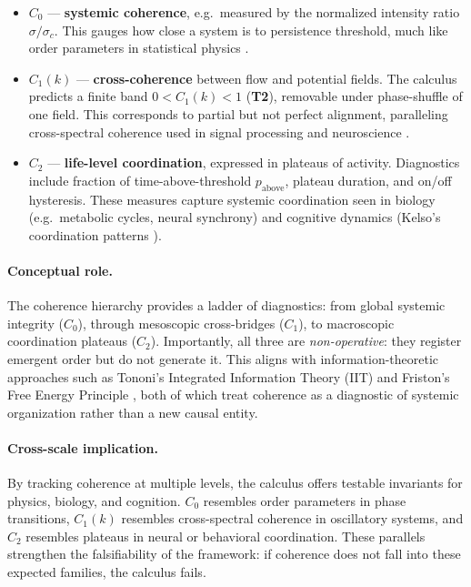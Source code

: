 \documentclass[12pt,a4paper,oneside]{scrreprt}
\begin{document}
\begin{itemize}
  \item $C_0$ — \textbf{systemic coherence}, e.g.\ measured by the normalized intensity ratio $\sigma/\sigma_c$. 
  This gauges how close a system is to persistence threshold, much like order parameters in statistical physics \citep{Stanley1971Phase}.
  
  \item $C_1(k)$ — \textbf{cross-coherence} between flow and potential fields. 
  The calculus predicts a finite band $0 < C_1(k) < 1$ (\textbf{T2}), 
  removable under phase-shuffle of one field. 
  This corresponds to partial but not perfect alignment, paralleling cross-spectral coherence used in signal processing and neuroscience \citep{Bendat2010Random}. 
  
  \item $C_2$ — \textbf{life-level coordination}, expressed in plateaus of activity. 
  Diagnostics include fraction of time-above-threshold $p_{\mathrm{above}}$, 
  plateau duration, and on/off hysteresis. 
  These measures capture systemic coordination seen in biology (e.g.\ metabolic cycles, neural synchrony) and cognitive dynamics (Kelso’s coordination patterns \citep{Kelso1995Coordination}).
\end{itemize}

\paragraph{Conceptual role.} 
The coherence hierarchy provides a ladder of diagnostics: 
from global systemic integrity ($C_0$), through mesoscopic cross-bridges ($C_1$), 
to macroscopic coordination plateaus ($C_2$). 
Importantly, all three are \emph{non-operative}: they register emergent order but 
do not generate it. 
This aligns with information-theoretic approaches such as Tononi’s 
Integrated Information Theory (IIT) \citep{Tononi2004IIT} and Friston’s 
Free Energy Principle \citep{Friston2010FEP}, both of which treat coherence 
as a diagnostic of systemic organization rather than a new causal entity.

\paragraph{Cross-scale implication.} 
By tracking coherence at multiple levels, the calculus offers testable invariants 
for physics, biology, and cognition. 
$C_0$ resembles order parameters in phase transitions, $C_1(k)$ resembles 
cross-spectral coherence in oscillatory systems, and $C_2$ resembles 
plateaus in neural or behavioral coordination. 
These parallels strengthen the falsifiability of the framework: 
if coherence does not fall into these expected families, the calculus fails.
\end{document}
